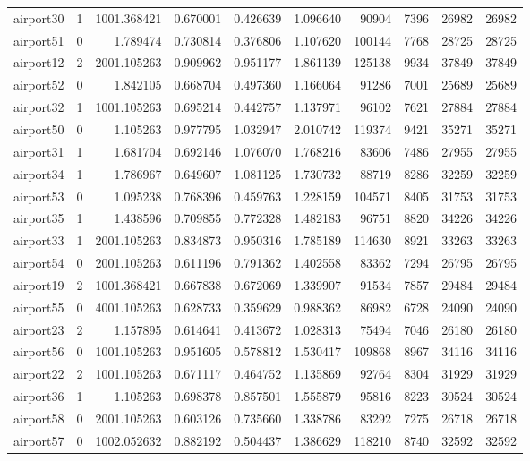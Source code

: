 \documentclass[../../../thesis.tex]{subfiles}
\begin{document}
\begin{longtable}{|l|r|r|r|r|r|r|r|r|r|}
airport30 & 1 & 1001.368421 & 0.670001 & 0.426639 & 1.096640 & 90904 & 7396 & 26982 & 26982 \\
airport51 & 0 & 1.789474 & 0.730814 & 0.376806 & 1.107620 & 100144 & 7768 & 28725 & 28725 \\
airport12 & 2 & 2001.105263 & 0.909962 & 0.951177 & 1.861139 & 125138 & 9934 & 37849 & 37849 \\
airport52 & 0 & 1.842105 & 0.668704 & 0.497360 & 1.166064 & 91286 & 7001 & 25689 & 25689 \\
airport32 & 1 & 1001.105263 & 0.695214 & 0.442757 & 1.137971 & 96102 & 7621 & 27884 & 27884 \\
airport50 & 0 & 1.105263 & 0.977795 & 1.032947 & 2.010742 & 119374 & 9421 & 35271 & 35271 \\
airport31 & 1 & 1.681704 & 0.692146 & 1.076070 & 1.768216 & 83606 & 7486 & 27955 & 27955 \\
airport34 & 1 & 1.786967 & 0.649607 & 1.081125 & 1.730732 & 88719 & 8286 & 32259 & 32259 \\
airport53 & 0 & 1.095238 & 0.768396 & 0.459763 & 1.228159 & 104571 & 8405 & 31753 & 31753 \\
airport35 & 1 & 1.438596 & 0.709855 & 0.772328 & 1.482183 & 96751 & 8820 & 34226 & 34226 \\
airport33 & 1 & 2001.105263 & 0.834873 & 0.950316 & 1.785189 & 114630 & 8921 & 33263 & 33263 \\
airport54 & 0 & 2001.105263 & 0.611196 & 0.791362 & 1.402558 & 83362 & 7294 & 26795 & 26795 \\
airport19 & 2 & 1001.368421 & 0.667838 & 0.672069 & 1.339907 & 91534 & 7857 & 29484 & 29484 \\
airport55 & 0 & 4001.105263 & 0.628733 & 0.359629 & 0.988362 & 86982 & 6728 & 24090 & 24090 \\
airport23 & 2 & 1.157895 & 0.614641 & 0.413672 & 1.028313 & 75494 & 7046 & 26180 & 26180 \\
airport56 & 0 & 1001.105263 & 0.951605 & 0.578812 & 1.530417 & 109868 & 8967 & 34116 & 34116 \\
airport22 & 2 & 1001.105263 & 0.671117 & 0.464752 & 1.135869 & 92764 & 8304 & 31929 & 31929 \\
airport36 & 1 & 1.105263 & 0.698378 & 0.857501 & 1.555879 & 95816 & 8223 & 30524 & 30524 \\
airport58 & 0 & 2001.105263 & 0.603126 & 0.735660 & 1.338786 & 83292 & 7275 & 26718 & 26718 \\
airport57 & 0 & 1002.052632 & 0.882192 & 0.504437 & 1.386629 & 118210 & 8740 & 32592 & 32592 \\

\end{longtable}
\end{document}
